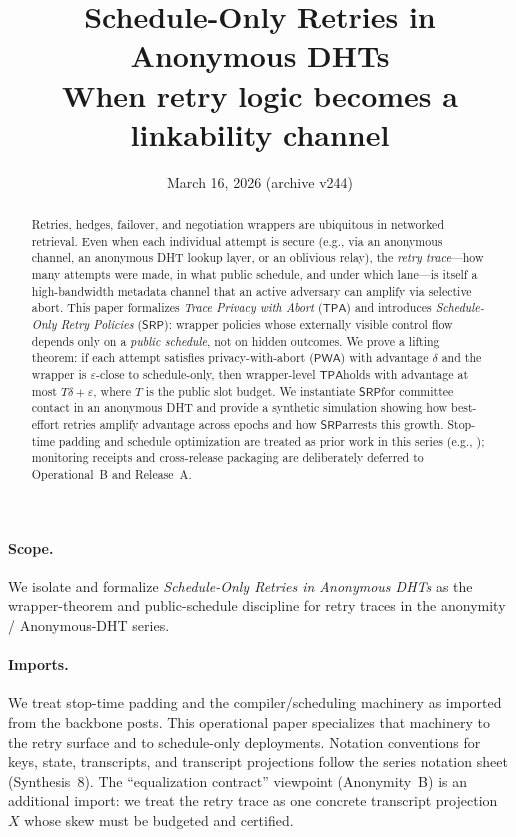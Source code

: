 \documentclass[11pt]{article}
\title{Schedule-Only Retries in Anonymous DHTs\\
\large When retry logic becomes a linkability channel}
\author{}
\date{March 16, 2026 (archive v244)}
\newcommand{\PWA}{\ensuremath{\mathsf{PWA}}}
\newcommand{\TPA}{\ensuremath{\mathsf{TPA}}}
\newcommand{\SRP}{\ensuremath{\mathsf{SRP}}}
\begin{document}
\maketitle

\begin{abstract}
Retries, hedges, failover, and negotiation wrappers are ubiquitous in networked retrieval.
Even when each individual attempt is secure (e.g., via an anonymous channel, an anonymous DHT lookup layer, or an oblivious relay),
the \emph{retry trace}---how many attempts were made, in what public schedule, and under which lane---is itself a high-bandwidth metadata channel that an active adversary can amplify via selective abort.
This paper formalizes \emph{Trace Privacy with Abort} (\TPA) and introduces \emph{Schedule-Only Retry Policies} (\SRP): wrapper policies whose externally visible control flow depends only on a \emph{public schedule}, not on hidden outcomes.
We prove a lifting theorem: if each attempt satisfies privacy-with-abort (\PWA) with advantage $\delta$ and the wrapper is $\varepsilon$-close to schedule-only, then wrapper-level \TPA holds with advantage at most $T\delta+\varepsilon$, where $T$ is the public slot budget.
We instantiate \SRP for committee contact in an anonymous DHT and provide a synthetic simulation showing how best-effort retries amplify advantage across epochs and how \SRP arrests this growth.
Stop-time padding and schedule optimization are treated as prior work in this series (e.g., \cite{series:schedcompiler,series:stoptimeaddendum}); monitoring receipts and cross-release packaging are deliberately deferred to Operational~B and Release~A.
\end{abstract}

\paragraph{Scope.}
We isolate and formalize \emph{Schedule-Only Retries in Anonymous DHTs} as the wrapper-theorem and public-schedule discipline for retry traces in the anonymity / Anonymous-DHT series.

\paragraph{Imports.}
We treat stop-time padding and the compiler/scheduling machinery as imported from the backbone posts.\cite{series:schedcompiler,series:stoptimeaddendum}
This operational paper specializes that machinery to the retry surface and to schedule-only deployments.
Notation conventions for keys, state, transcripts, and transcript projections follow the series notation sheet (Synthesis~8).\cite{series:notation}
The ``equalization contract'' viewpoint (Anonymity~B) is an additional import: we treat the retry trace as one concrete transcript projection $X$ whose skew must be budgeted and certified.\cite{series:profiling}
\end{document}
